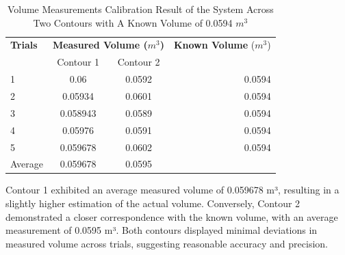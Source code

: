 \begin{enumerate}
	      \begin{table}[H]
		      \centering
		      \begin{threeparttable}
			      \caption{Volume Measurements Calibration Result of the System Across Two Contours with A Known Volume of 0.0594 $m^3$}
			      \label{table:test_case_2-1_results}
			      \begin{tabular}{l c c r}
				      \toprule
				      \textbf{Trials} & \multicolumn{2}{c}{\textbf{Measured Volume ($m^{3}$)}} & \textbf{Known Volume} ($m^{3}$)          \\
				      {}              & Contour 1                                              & Contour 2                       & {}     \\ \midrule
				      1               & 0.06                                                   & 0.0592                          & 0.0594 \\
				      2               & 0.05934                                                & 0.0601                          & 0.0594 \\
				      3               & 0.058943                                               & 0.0589                          & 0.0594 \\
				      4               & 0.05976                                                & 0.0591                          & 0.0594 \\
				      5               & 0.059678                                               & 0.0602                          & 0.0594 \\ \midrule
				      Average         & 0.059678                                               & 0.0595                          & {}     \\ \bottomrule
			      \end{tabular}
		      \end{threeparttable}
	      \end{table}


	      Contour 1 exhibited an average measured volume of 0.059678 m³, resulting in a slightly higher estimation of the actual volume. Conversely, Contour 2 demonstrated a closer correspondence with the known volume, with an average measurement of 0.0595 m³. Both contours displayed minimal deviations in measured volume across trials, suggesting reasonable accuracy and precision.


\end{enumerate}
